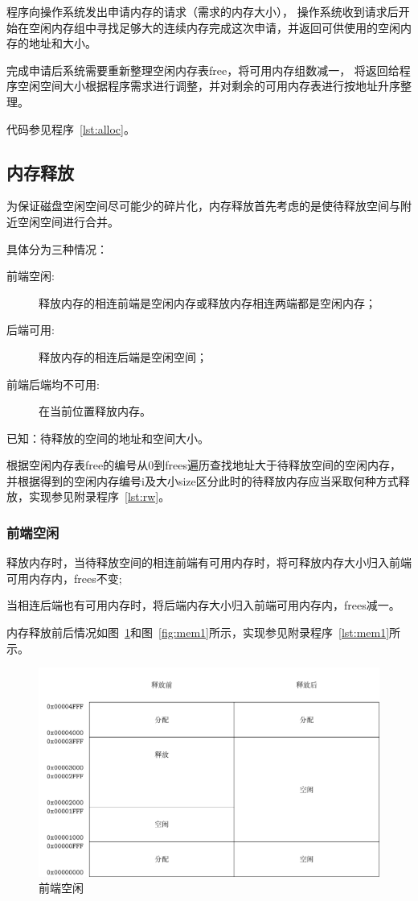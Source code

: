 程序向操作系统发出申请内存的请求（需求的内存大小），
操作系统收到请求后开始在空闲内存组中寻找足够大的连续内存完成这次申请，并返回可供使用的空闲内存的地址和大小。

完成申请后系统需要重新整理空闲内存表free，将可用内存组数减一，
将返回给程序空闲空间大小根据程序需求进行调整，并对剩余的可用内存表进行按地址升序整理。

代码参见程序~\ref{lst:alloc}。


\subsection{内存释放}

为保证磁盘空闲空间尽可能少的碎片化，内存释放首先考虑的是使待释放空间与附近空闲空间进行合并\cite{bryant2003computer}。

具体分为三种情况：

\begin{description}
\item[前端空闲:]释放内存的相连前端是空闲内存或释放内存相连两端都是空闲内存；
\item[后端可用:]释放内存的相连后端是空闲空间；
\item[前端后端均不可用:]在当前位置释放内存。
\end{description}

\newpage

已知：待释放的空间的地址和空间大小。

根据空闲内存表free的编号从0到frees遍历查找地址大于待释放空间的空闲内存，
并根据得到的空闲内存编号i及大小size区分此时的待释放内存应当采取何种方式释放，实现参见附录程序~\ref{lst:rw}。

\subsubsection{前端空闲}

释放内存时，当待释放空间的相连前端有可用内存时，将可释放内存大小归入前端可用内存内，frees不变;

当相连后端也有可用内存时，将后端内存大小归入前端可用内存内，frees减一。

内存释放前后情况如图~\ref{fig:mem0}和图~\ref{fig:mem1}所示，实现参见附录程序~\ref{lst:mem1}所示。

\begin{figure}[H]
  \centering
  \includegraphics[width=.7\textwidth]{../Fig/mem/mem0.pdf}
  \caption{前端空闲}
  \label{fig:mem0}
\end{figure}

